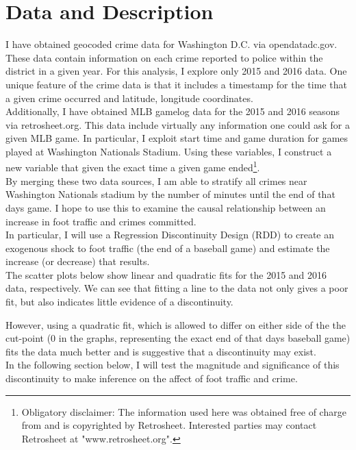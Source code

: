 \documentclass{article}
\begin{document}
\section{Data and Description}

I have obtained geocoded crime data for Washington D.C. via opendatadc.gov. These data contain information on each crime reported to police within the district in a given year. For this analysis, I explore only 2015 and 2016 data. One unique feature of the crime data is that it includes a timestamp for the time that a given crime occurred and latitude, longitude coordinates.\\

Additionally, I have obtained MLB gamelog data for the 2015 and 2016 seasons via retrosheet.org. This data include virtually any information one could ask for a given MLB game. In particular, I exploit start time and game duration for games played at Washington Nationals Stadium. Using these variables, I construct a new variable that given the exact time a given game ended\footnote{Obligatory disclaimer: The information used here was obtained free of
     charge from and is copyrighted by Retrosheet.  Interested
     parties may contact Retrosheet at "www.retrosheet.org".
}.\\

By merging these two data sources, I am able to stratify all crimes near Washington Nationals stadium by the number of minutes until the end of that days game. I hope to use this to examine the causal relationship between an increase in foot traffic and crimes committed.\\

In particular, I will use a Regression Discontinuity Design (RDD) to create an exogenous shock to foot traffic (the end of a baseball game) and estimate the increase (or decrease) that results.\\

The scatter plots below show linear and quadratic fits for the 2015 and 2016 data, respectively. We can see that fitting a line to the data not only gives a poor fit, but also indicates little evidence of a discontinuity.

However, using  a quadratic fit, which is allowed to differ on either side of the the cut-point (0 in the graphs, representing the exact end of that days baseball game) fits the data much better and is suggestive that a discontinuity may exist. \\

In the following section below, I will test the magnitude and significance of this discontinuity to make inference on the affect of foot traffic and crime.
\end{document}
